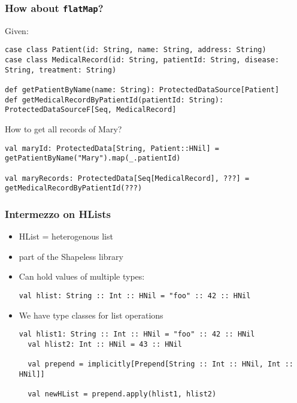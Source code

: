 \documentclass[aspectratio=169]{beamer}
\begin{document}
\begin{frame}[fragile]
\frametitle{How about \texttt{flatMap}?}

Given:

\begin{lstlisting}[style=myScalastyle,frame=none]
case class Patient(id: String, name: String, address: String)
case class MedicalRecord(id: String, patientId: String, disease: String, treatment: String)

def getPatientByName(name: String): ProtectedDataSource[Patient]
def getMedicalRecordByPatientId(patientId: String): ProtectedDataSourceF[Seq, MedicalRecord]
\end{lstlisting}

How to get all records of Mary?
\pause


\begin{lstlisting}[style=myScalastyle,frame=none]
val maryId: ProtectedData[String, Patient::HNil] = getPatientByName("Mary").map(_.patientId)

val maryRecords: ProtectedData[Seq[MedicalRecord], ???] = getMedicalRecordByPatientId(???)
\end{lstlisting}


\end{frame}

\begin{frame}[fragile]
\frametitle{Intermezzo on HLists}

\begin{itemize}
  \item HList = heterogenous list
  \item part of the Shapeless library
  \pause
  \item Can hold values of multiple types:
  \begin{lstlisting}[style=myScalastyle,frame=none]
val hlist: String :: Int :: HNil = "foo" :: 42 :: HNil
\end{lstlisting}
  \pause
  \item We have type classes for list operations
  
  \begin{lstlisting}[style=myScalastyle,frame=none]
  val hlist1: String :: Int :: HNil = "foo" :: 42 :: HNil
  val hlist2: Int :: HNil = 43 :: HNil

  val prepend = implicitly[Prepend[String :: Int :: HNil, Int :: HNil]]

  val newHList = prepend.apply(hlist1, hlist2)
  \end{lstlisting}
\end{itemize}

\end{frame}
\end{document}
